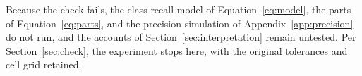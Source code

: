 Because the check fails, the class-recall model of Equation~\eqref{eq:model}, the parts of Equation~\eqref{eq:parts}, and the precision simulation of Appendix~\ref{app:precision} do not run, and the accounts of Section~\ref{sec:interpretation} remain untested. Per Section~\ref{sec:check}, the experiment stops here, with the original tolerances and cell grid retained.
